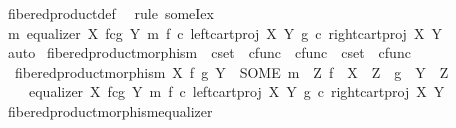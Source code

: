 \begin{isabellebody}
\ fibered{\isacharunderscore}{\kern0pt}product{\isacharunderscore}{\kern0pt}def\ \isamarkupfalse%
\ {\isacharparenleft}{\kern0pt}rule\ someI{\isacharunderscore}{\kern0pt}ex{\isacharparenright}{\kern0pt}\isanewline
\ \ \isamarkupfalse%
\ \isamarkupfalse%
\ {\isachardoublequoteopen}{\isasymexists}m{\isachardot}{\kern0pt}\ equalizer\ {\isacharparenleft}{\kern0pt}X\ \isactrlbsub f\isactrlesub {\isasymtimes}\isactrlsub c\isactrlbsub g\isactrlesub \ Y{\isacharparenright}{\kern0pt}\ m\ {\isacharparenleft}{\kern0pt}f\ {\isasymcirc}\isactrlsub c\ left{\isacharunderscore}{\kern0pt}cart{\isacharunderscore}{\kern0pt}proj\ X\ Y{\isacharparenright}{\kern0pt}\ {\isacharparenleft}{\kern0pt}g\ {\isasymcirc}\isactrlsub c\ right{\isacharunderscore}{\kern0pt}cart{\isacharunderscore}{\kern0pt}proj\ X\ Y{\isacharparenright}{\kern0pt}{\isachardoublequoteclose}\isanewline
\ \ \ \ \isamarkupfalse%
\ auto\isanewline
{}\isamarkupfalse%
%
\endisatagproof
{\isafoldproof}%
%
\isadelimproof
\isanewline
%
\endisadelimproof
\isanewline
{}\isamarkupfalse%
\ fibered{\isacharunderscore}{\kern0pt}product{\isacharunderscore}{\kern0pt}morphism\ {\isacharcolon}{\kern0pt}{\isacharcolon}{\kern0pt}\ {\isachardoublequoteopen}cset\ {\isasymRightarrow}\ cfunc\ {\isasymRightarrow}\ cfunc\ {\isasymRightarrow}\ cset\ {\isasymRightarrow}\ cfunc{\isachardoublequoteclose}\ \isanewline
\ \ {\isachardoublequoteopen}fibered{\isacharunderscore}{\kern0pt}product{\isacharunderscore}{\kern0pt}morphism\ X\ f\ g\ Y\ {\isacharequal}{\kern0pt}\ {\isacharparenleft}{\kern0pt}SOME\ m{\isachardot}{\kern0pt}\ {\isasymexists}\ Z{\isachardot}{\kern0pt}\ f\ {\isacharcolon}{\kern0pt}\ X\ {\isasymrightarrow}\ Z\ {\isasymand}\ g\ {\isacharcolon}{\kern0pt}\ Y\ {\isasymrightarrow}\ Z\ {\isasymand}\isanewline
\ \ \ \ equalizer\ {\isacharparenleft}{\kern0pt}X\ \isactrlbsub f\isactrlesub {\isasymtimes}\isactrlsub c\isactrlbsub g\isactrlesub \ Y{\isacharparenright}{\kern0pt}\ m\ {\isacharparenleft}{\kern0pt}f\ {\isasymcirc}\isactrlsub c\ left{\isacharunderscore}{\kern0pt}cart{\isacharunderscore}{\kern0pt}proj\ X\ Y{\isacharparenright}{\kern0pt}\ {\isacharparenleft}{\kern0pt}g\ {\isasymcirc}\isactrlsub c\ right{\isacharunderscore}{\kern0pt}cart{\isacharunderscore}{\kern0pt}proj\ X\ Y{\isacharparenright}{\kern0pt}{\isacharparenright}{\kern0pt}{\isachardoublequoteclose}\isanewline
\isanewline
{}\isamarkupfalse%
\ fibered{\isacharunderscore}{\kern0pt}product{\isacharunderscore}{\kern0pt}morphism{\isacharunderscore}{\kern0pt}equalizer{\isacharcolon}{\kern0pt}\isanewline

\end{isabellebody}

